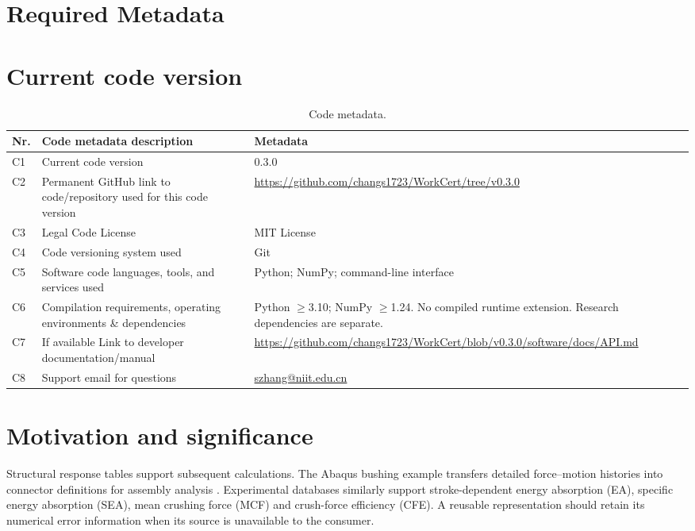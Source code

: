 \documentclass[preprint,12pt,a4paper]{elsarticle}
\begin{document}
\section*{Required Metadata}\section*{Current code version}
\begin{table}[H]\small\centering
\begin{tabular}{|P{.05\linewidth}|P{.39\linewidth}|P{.425\linewidth}|}\hline
\textbf{Nr.}&\textbf{Code metadata description}&\textbf{Metadata}\\\hline
C1&Current code version&0.3.0\\\hline
C2&Permanent GitHub link to code/repository used for this code version&\url{https://github.com/changs1723/WorkCert/tree/v0.3.0}\\\hline
C3&Legal Code License&MIT License\\\hline
C4&Code versioning system used&Git\\\hline
C5&Software code languages, tools, and services used&Python; NumPy; command-line interface\\\hline
C6&Compilation requirements, operating environments \& dependencies&Python $\geq$3.10; NumPy $\geq$1.24. No compiled runtime extension. Research dependencies are separate.\\\hline
C7&If available Link to developer documentation/manual&\url{https://github.com/changs1723/WorkCert/blob/v0.3.0/software/docs/API.md}\\\hline
C8&Support email for questions&\href{mailto:szhang@niit.edu.cn}{szhang@niit.edu.cn}\\\hline
\end{tabular}\caption{Code metadata.}\end{table}

\section{Motivation and significance}
Structural response tables support subsequent calculations. The Abaqus bushing example transfers detailed force--motion histories into connector definitions for assembly analysis \cite{AbaqusBushing}. Experimental databases similarly support stroke-dependent energy absorption (EA), specific energy absorption (SEA), mean crushing force (MCF) and crush-force efficiency (CFE). A reusable representation should retain its numerical error information when its source is unavailable to the consumer.
\end{document}
